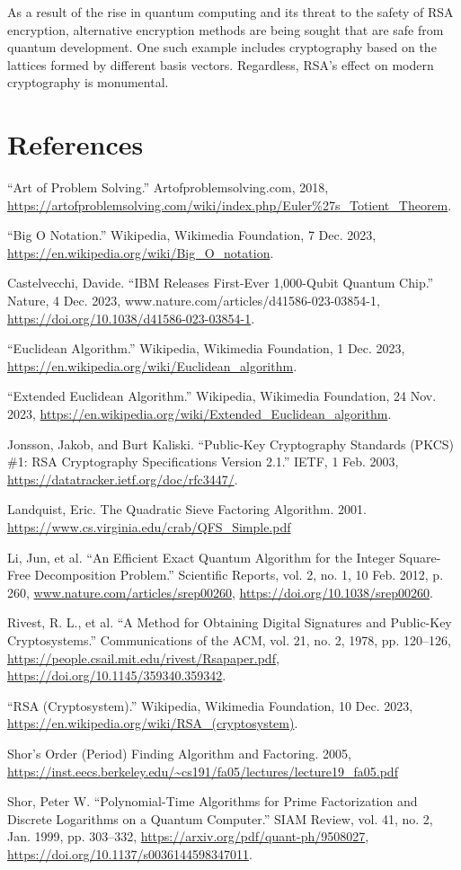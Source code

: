 \documentclass{article}
\begin{document}
As a result of the rise in quantum computing and its threat to the safety of RSA encryption, alternative encryption methods are being sought that are safe from quantum development. One such example includes cryptography based on the lattices formed by different basis vectors. Regardless, RSA's effect on modern cryptography is monumental.
\newpage

\section{References}
\begin{sloppypar}
“Art of Problem Solving.” Artofproblemsolving.com, 2018, \url{https://artofproblemsolving.com/wiki/index.php/Euler%27s_Totient_Theorem}.

“Big O Notation.” Wikipedia, Wikimedia Foundation, 7 Dec. 2023, \url{https://en.wikipedia.org/wiki/Big_O_notation}. 

Castelvecchi, Davide. “IBM Releases First-Ever 1,000-Qubit Quantum Chip.” Nature, 4 Dec. 2023, www.nature.com/articles/d41586-023-03854-1, \url{https://doi.org/10.1038/d41586-023-03854-1}.

“Euclidean Algorithm.” Wikipedia, Wikimedia Foundation, 1 Dec. 2023, \url{https://en.wikipedia.org/wiki/Euclidean_algorithm}. 

“Extended Euclidean Algorithm.” Wikipedia, Wikimedia Foundation, 24 Nov. 2023, \url{https://en.wikipedia.org/wiki/Extended_Euclidean_algorithm}. 

Jonsson, Jakob, and Burt Kaliski. “Public-Key Cryptography Standards (PKCS) \#1: RSA Cryptography Specifications Version 2.1.” IETF, 1 Feb. 2003, \url{https://datatracker.ietf.org/doc/rfc3447/}.

Landquist, Eric. The Quadratic Sieve Factoring Algorithm. 2001. \url{https://www.cs.virginia.edu/crab/QFS_Simple.pdf}

Li, Jun, et al. “An Efficient Exact Quantum Algorithm for the Integer Square-Free Decomposition Problem.” Scientific Reports, vol. 2, no. 1, 10 Feb. 2012, p. 260, \url{www.nature.com/articles/srep00260}, \url{https://doi.org/10.1038/srep00260}.

Rivest, R. L., et al. “A Method for Obtaining Digital Signatures and Public-Key Cryptosystems.” Communications of the ACM, vol. 21, no. 2, 1978, pp. 120–126, \url{https://people.csail.mit.edu/rivest/Rsapaper.pdf}, \url{https://doi.org/10.1145/359340.359342}.

“RSA (Cryptosystem).” Wikipedia, Wikimedia Foundation, 10 Dec. 2023, \url{https://en.wikipedia.org/wiki/RSA_(cryptosystem)}. 

Shor’s Order (Period) Finding Algorithm and Factoring. 2005,
\url{https://inst.eecs.berkeley.edu/~cs191/fa05/lectures/lecture19_fa05.pdf}

Shor, Peter W. “Polynomial-Time Algorithms for Prime Factorization and Discrete Logarithms on a Quantum Computer.” SIAM Review, vol. 41, no. 2, Jan. 1999, pp. 303–332, \url{https://arxiv.org/pdf/quant-ph/9508027}, \url{https://doi.org/10.1137/s0036144598347011}.


\end{sloppypar}
\end{document}
